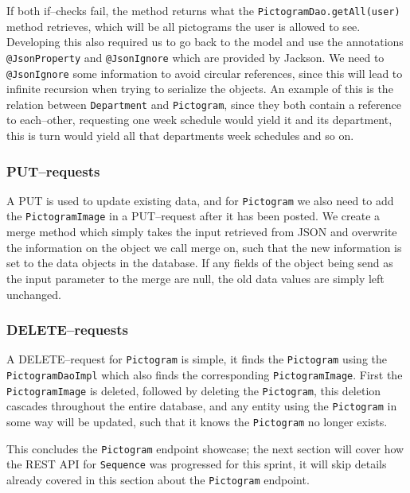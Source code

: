 If both if--checks fail, the method returns what the \texttt{PictogramDao.getAll(user)} method retrieves, which will be all pictograms the user is allowed to see.
Developing this also required us to go back to the model and use the annotations \texttt{@JsonProperty} and \texttt{@JsonIgnore} which are provided by Jackson.
We need to \texttt{@JsonIgnore} some information to avoid circular references, since this will lead to infinite recursion when trying to serialize the objects.
An example of this is the relation between \texttt{Department} and \texttt{Pictogram}, since they both contain a reference to each--other, requesting one week schedule would yield it and its department, this is turn would yield all that departments week schedules and so on.

\subsubsection*{PUT--requests}
A PUT is used to update existing data, and for \texttt{Pictogram} we also need to add the \texttt{PictogramImage} in a PUT--request after it has been posted.
We create a merge method which simply takes the input retrieved from JSON and overwrite the information on the object we call merge on, such that the new information is set to the data objects in the database.
If any fields of the object being send as the input parameter to the merge are null, the old data values are simply left unchanged.

\subsubsection*{DELETE--requests}
A DELETE--request for \texttt{Pictogram} is simple, it finds the \texttt{Pictogram} using the \texttt{PictogramDaoImpl} which also finds the corresponding \texttt{PictogramImage}.
First the \texttt{PictogramImage} is deleted, followed by deleting the \texttt{Pictogram}, this deletion cascades throughout the entire database, and any entity using the \texttt{Pictogram} in some way will be updated, such that it knows the \texttt{Pictogram} no longer exists.

This concludes the \texttt{Pictogram} endpoint showcase; the next section will cover how the REST API for \texttt{Sequence} was progressed for this sprint, it will skip details already covered in this section about the \texttt{Pictogram} endpoint.
